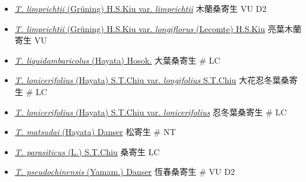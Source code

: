 \begin{itemize}
  \begin{itemize}
        \item[] \href{http://www.theplantlist.org/tpl1.1/search?q=Taxillus+limprichtii+var.+limprichtii}{\textit{T. limprichtii} (Grüning) H.S.Kiu var. \textit{limprichtii}}   木蘭桑寄生   VU D2
        \item[] \href{http://www.theplantlist.org/tpl1.1/search?q=Taxillus+limprichtii+var.+longiflorus}{\textit{T. limprichtii} (Grüning) H.S.Kiu var. \textit{longiflorus} (Lecomte) H.S.Kiu}   亮葉木蘭寄生   VU
        \item[] \href{http://www.theplantlist.org/tpl1.1/search?q=Taxillus+liquidambaricolus}{\textit{T. liquidambaricolus} (Hayata) Hosok.}   大葉桑寄生  \# LC
        \item[] \href{http://www.theplantlist.org/tpl1.1/search?q=Taxillus+lonicerifolius+var.+longifolius}{\textit{T. lonicerifolius} (Hayata) S.T.Chiu var. \textit{longifolius} S.T.Chiu}   大花忍冬葉桑寄生  \# LC
        \item[] \href{http://www.theplantlist.org/tpl1.1/search?q=Taxillus+lonicerifolius+var.+lonicerifolius}{\textit{T. lonicerifolius} (Hayata) S.T.Chiu var. \textit{lonicerifolius}}   忍冬葉桑寄生  \# LC
        \item[] \href{http://www.theplantlist.org/tpl1.1/search?q=Taxillus+matsudai}{\textit{T. matsudai} (Hayata) Danser}   松寄生  \# NT
        \item[] \href{http://www.theplantlist.org/tpl1.1/search?q=Taxillus+parasiticus}{\textit{T. parasiticus} (L.) S.T.Chiu}   桑寄生   LC
        \item[] \href{http://www.theplantlist.org/tpl1.1/search?q=Taxillus+pseudochinensis}{\textit{T. pseudochinensis} (Yamam.) Danser}   恆春桑寄生  \# VU D2

\end{itemize}
\end{itemize}
